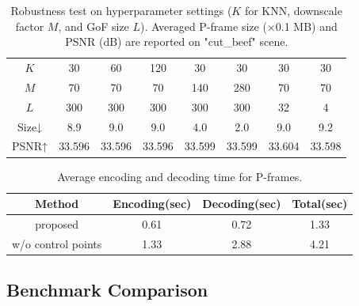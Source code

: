\documentclass[letterpaper]{article} %
\begin{document}
\begin{table}[h]
  \centering
  \label{tab:hyperparameters_robustness}
   \small
   \setlength{\tabcolsep}{2pt}
   
  \begin{tabular}{c|ccccccc}
    \toprule
    $K$ & 30 & 60 & 120 & 30 & 30 & 30 & 30 \\

    $M$   & 70 & 70 & 70 & 140 & 280 & 70 & 70 \\

    $L$   & 300 & 300 & 300 & 300 & 300 & 32 & 4\\
    \midrule
    Size↓ & 8.9 & 9.0 & 9.0 & 4.0 & 2.0 & 9.0 & 9.2\\
     PSNR↑  & 33.596 & 33.596 & 33.596 & 33.599 & 33.599 & 33.604 & 33.598\\
    \bottomrule
  \end{tabular}
    \caption{Robustness test on hyperparameter settings ($K$ for KNN, downscale factor $M$, and GoF size $L$). Averaged P-frame size ($\times$0.1 MB) and PSNR (dB) are reported on "cut\_beef" scene.}
\end{table}

\begin{table}[t]
  \centering
  \label{tab:time}
  \small
  \setlength{\tabcolsep}{4pt}
  \begin{tabular}{c|ccc}
    \toprule
    Method&Encoding(sec) & Decoding(sec)  & Total(sec) \\
    \midrule
     proposed &0.61& 0.72& 1.33 \\
     w/o control points &1.33& 2.88& 4.21 \\
    \bottomrule
    \end{tabular}
  \caption{Average encoding and decoding time for P-frames.}
\end{table}

\subsection{Benchmark Comparison}
\label{sec:Q1}
\end{document}
